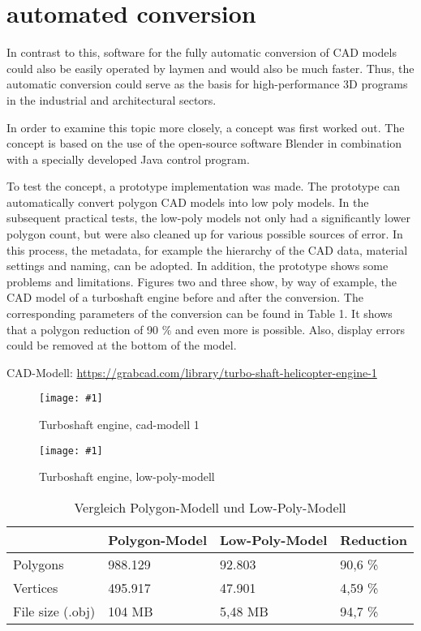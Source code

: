 \documentclass[a4paper, 10pt, journal]{wissarbIEEE}      %
\newcommand{\bild}[3]{
\begin{figure}[h]
\centering
  \texttt{[image: \#1]}
  \caption{#3}
  \label{#1}
\end{figure}}
\begin{document}
\section{automated conversion}
In contrast to this, software for the fully automatic conversion of CAD models could also be easily operated by laymen and would also be much faster. Thus, the automatic conversion could serve as the basis for high-performance 3D programs in the industrial and architectural sectors.

In order to examine this topic more closely, a concept was first worked out. The concept is based on the use of the open-source software Blender in combination with a specially developed Java control program.

To test the concept, a prototype implementation was made. The prototype can automatically convert polygon CAD models into low poly models. In the subsequent practical tests, the low-poly models not only had a significantly lower polygon count, but were also cleaned up for various possible sources of error. In this process, the metadata, for example the hierarchy of the CAD data, material settings and naming, can be adopted. In addition, the prototype shows some problems and limitations. Figures two and three show, by way of example, the CAD model of a turboshaft engine before and after the conversion. The corresponding parameters of the conversion can be found in Table 1. It shows that a polygon reduction of 90 \% and even more is possible. Also, display errors could be removed at the bottom of the model.

CAD-Modell: \hyperlink{https://grabcad.com/library/turbo-shaft-helicopter-engine-1}{https://grabcad.com/library/turbo-shaft-helicopter-engine-1} 

\bild{bilder/b2}{8cm}{ Turboshaft engine, 
cad-modell 1 }
\clearpage
\bild{bilder/b3}{8cm}{ Turboshaft engine, low-poly-modell }



\begin{table}[]
\caption{Vergleich Polygon-Modell und Low-Poly-Modell}
\label{my-label}
\begin{tabular}{llll}
\hline
                                      & Polygon-Model & Low-Poly-Model & Reduction \\ \hline
\multicolumn{1}{l|}{Polygons}         & 988.129       & 92.803         & 90,6 \%   \\
\multicolumn{1}{l|}{Vertices}         & 495.917       & 47.901         & 4,59 \%   \\
\multicolumn{1}{l|}{File size (.obj)} & 104 MB        & 5,48 MB        & 94,7 \%  
\end{tabular}
\end{table}
\end{document}
